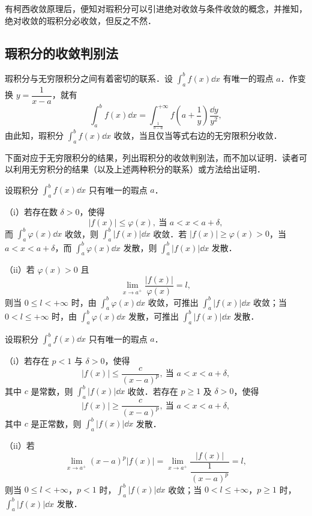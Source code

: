 有柯西收敛原理后，便知对瑕积分可以引进绝对收敛与条件收敛的概念，并推知，绝对收敛的瑕积分必收敛，但反之不然．

\subsection{瑕积分的收敛判别法}

瑕积分与无穷限积分之间有着密切的联系．设 $\displaystyle\int_{a}^{b}f(x)\dd x$ 有唯一的瑕点 $a$．作变换 $y=\dfrac{1}{x-a}$，就有
\[
\int_{a}^{b}f(x)\dd x=\int_{\frac{1}{b-a}}^{+\infty}f\!\left(a+\frac{1}{y}\right)\frac{\dd y}{y^{2}},
\]
由此知，瑕积分 $\displaystyle\int_{a}^{b}f(x)\dd x$ 收敛，当且仅当等式右边的无穷限积分收敛．

下面对应于无穷限积分的结果，列出瑕积分的收敛判别法，而不加以证明．读者可以利用无穷积分的结果（以及上述两种积分的联系）或方法给出证明．

\begin{theorem}[比较判别法]\label{thm:11-9}
设瑕积分 $\displaystyle\int_{a}^{b}f(x)\dd x$ 只有唯一的瑕点 $a$．

（i）若存在数 $\delta>0$，使得
\[
\left|f(x)\right|\leqslant\varphi(x),\ \text{当 }a<x<a+\delta,
\]
而 $\displaystyle\int_{a}^{b}\varphi(x)\dd x$ 收敛，则 $\displaystyle\int_{a}^{b}\left|f(x)\right|\dd x$ 收敛．若 $\left|f(x)\right|\geqslant\varphi(x)>0$，当 $a<x<a+\delta$，而 $\displaystyle\int_{a}^{b}\varphi(x)\dd x$ 发散，则 $\displaystyle\int_{a}^{b}\left|f(x)\right|\dd x$ 发散．

（ii）若 $\varphi(x)>0$ 且
\[
\lim_{x\to a^{+}}\frac{\left|f(x)\right|}{\varphi(x)}=l,
\]
则当 $0\leqslant l<+\infty$ 时，由 $\displaystyle\int_{a}^{b}\varphi(x)\dd x$ 收敛，可推出 $\displaystyle\int_{a}^{b}\left|f(x)\right|\dd x$ 收敛；当 $0<l\leqslant+\infty$ 时，由 $\displaystyle\int_{a}^{b}\varphi(x)\dd x$ 发散，可推出 $\displaystyle\int_{a}^{b}\left|f(x)\right|\dd x$ 发散．
\end{theorem}

\begin{theorem}\label{thm:11-10}
设瑕积分 $\displaystyle\int_{a}^{b}f(x)\dd x$ 只有唯一的瑕点 $a$．

（i）若存在 $p<1$ 与 $\delta>0$，使得
\[
\left|f(x)\right|\leqslant\frac{c}{(x-a)^{p}},\ \text{当 }a<x<a+\delta,
\]
其中 $c$ 是常数，则 $\displaystyle\int_{a}^{b}\left|f(x)\right|\dd x$ 收敛．若存在 $p\geqslant 1$ 及 $\delta>0$，使得
\[
\left|f(x)\right|\geqslant\frac{c}{(x-a)^{p}},\ \text{当 }a<x<a+\delta,
\]
其中 $c$ 是正常数，则 $\displaystyle\int_{a}^{b}\left|f(x)\right|\dd x$ 发散．

（ii）若
\[
\lim_{x\to a^{+}}(x-a)^{p}\left|f(x)\right|=\lim_{x\to a^{+}}\frac{\left|f(x)\right|}{\dfrac{1}{(x-a)^{p}}}=l,
\]
则当 $0\leqslant l<+\infty$，$p<1$ 时，$\displaystyle\int_{a}^{b}\left|f(x)\right|\dd x$ 收敛；当 $0<l\leqslant+\infty$，$p\geqslant 1$ 时，$\displaystyle\int_{a}^{b}\left|f(x)\right|\dd x$ 发散．
\end{theorem}

